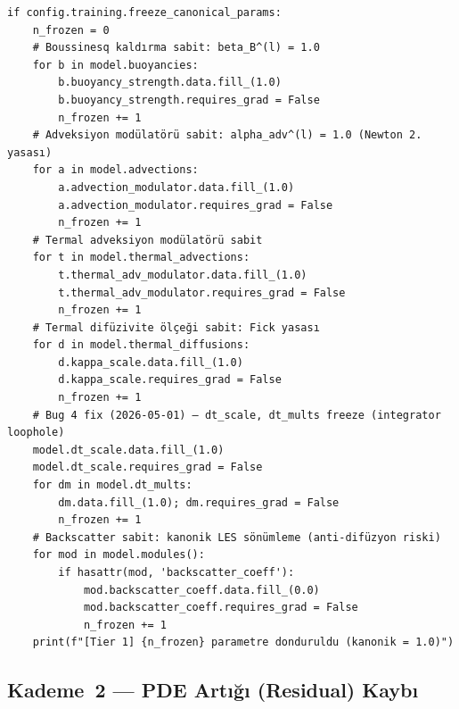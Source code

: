 \begin{lstlisting}[caption={Kademe~1 parametre hijyeni — kanonik parametreleri 1.0'a sabitle ve gradyandan çıkar. Tam dosya: \texttt{train.py:1995+}.}, label={code:tier1_freeze}]
if config.training.freeze_canonical_params:
    n_frozen = 0
    # Boussinesq kaldırma sabit: beta_B^(l) = 1.0
    for b in model.buoyancies:
        b.buoyancy_strength.data.fill_(1.0)
        b.buoyancy_strength.requires_grad = False
        n_frozen += 1
    # Adveksiyon modülatörü sabit: alpha_adv^(l) = 1.0 (Newton 2. yasası)
    for a in model.advections:
        a.advection_modulator.data.fill_(1.0)
        a.advection_modulator.requires_grad = False
        n_frozen += 1
    # Termal adveksiyon modülatörü sabit
    for t in model.thermal_advections:
        t.thermal_adv_modulator.data.fill_(1.0)
        t.thermal_adv_modulator.requires_grad = False
        n_frozen += 1
    # Termal difüzivite ölçeği sabit: Fick yasası
    for d in model.thermal_diffusions:
        d.kappa_scale.data.fill_(1.0)
        d.kappa_scale.requires_grad = False
        n_frozen += 1
    # Bug 4 fix (2026-05-01) — dt_scale, dt_mults freeze (integrator loophole)
    model.dt_scale.data.fill_(1.0)
    model.dt_scale.requires_grad = False
    for dm in model.dt_mults:
        dm.data.fill_(1.0); dm.requires_grad = False
        n_frozen += 1
    # Backscatter sabit: kanonik LES sönümleme (anti-difüzyon riski)
    for mod in model.modules():
        if hasattr(mod, 'backscatter_coeff'):
            mod.backscatter_coeff.data.fill_(0.0)
            mod.backscatter_coeff.requires_grad = False
            n_frozen += 1
    print(f"[Tier 1] {n_frozen} parametre donduruldu (kanonik = 1.0)")
\end{lstlisting}

\subsection{Kademe~2 — PDE Artığı (Residual) Kaybı}
\label{subsec:tier2_residual}

